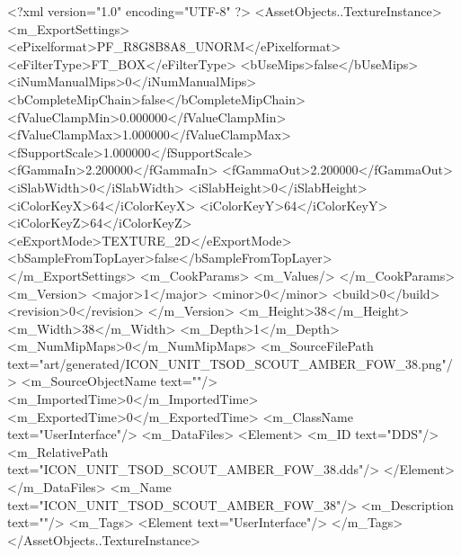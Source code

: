 <?xml version="1.0" encoding="UTF-8" ?>
<AssetObjects..TextureInstance>
	<m_ExportSettings>
		<ePixelformat>PF_R8G8B8A8_UNORM</ePixelformat>
		<eFilterType>FT_BOX</eFilterType>
		<bUseMips>false</bUseMips>
		<iNumManualMips>0</iNumManualMips>
		<bCompleteMipChain>false</bCompleteMipChain>
		<fValueClampMin>0.000000</fValueClampMin>
		<fValueClampMax>1.000000</fValueClampMax>
		<fSupportScale>1.000000</fSupportScale>
		<fGammaIn>2.200000</fGammaIn>
		<fGammaOut>2.200000</fGammaOut>
		<iSlabWidth>0</iSlabWidth>
		<iSlabHeight>0</iSlabHeight>
		<iColorKeyX>64</iColorKeyX>
		<iColorKeyY>64</iColorKeyY>
		<iColorKeyZ>64</iColorKeyZ>
		<eExportMode>TEXTURE_2D</eExportMode>
		<bSampleFromTopLayer>false</bSampleFromTopLayer>
	</m_ExportSettings>
	<m_CookParams>
		<m_Values/>
	</m_CookParams>
	<m_Version>
		<major>1</major>
		<minor>0</minor>
		<build>0</build>
		<revision>0</revision>
	</m_Version>
	<m_Height>38</m_Height>
	<m_Width>38</m_Width>
	<m_Depth>1</m_Depth>
	<m_NumMipMaps>0</m_NumMipMaps>
	<m_SourceFilePath text="art/generated/ICON_UNIT_TSOD_SCOUT_AMBER_FOW_38.png"/>
	<m_SourceObjectName text=""/>
	<m_ImportedTime>0</m_ImportedTime>
	<m_ExportedTime>0</m_ExportedTime>
	<m_ClassName text="UserInterface"/>
	<m_DataFiles>
		<Element>
			<m_ID text="DDS"/>
			<m_RelativePath text="ICON_UNIT_TSOD_SCOUT_AMBER_FOW_38.dds"/>
		</Element>
	</m_DataFiles>
	<m_Name text="ICON_UNIT_TSOD_SCOUT_AMBER_FOW_38"/>
	<m_Description text=""/>
	<m_Tags>
		<Element text="UserInterface"/>
	</m_Tags>
</AssetObjects..TextureInstance>
